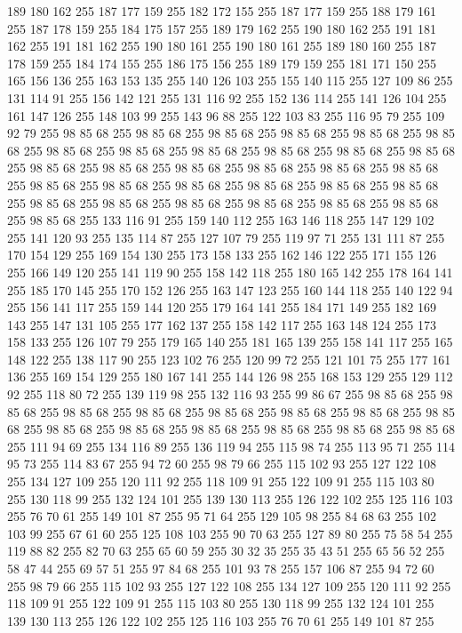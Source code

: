 189 180 162 255 187 177 159 255 182 172 155 255 187 177 159 255 188 179 161 255 187 178 159 255 184 175 157 255 189 179 162 255 190 180 162 255 191 181 162 255 191 181 162 255 190 180 161 255 190 180 161 255 189 180 160 255 187 178 159 255 184 174 155 255 186 175 156 255 189 179 159 255 181 171 150 255 165 156 136 255 163 153 135 255 140 126 103 255 155 140 115 255 127 109 86 255 131 114 91 255 156 142 121 255 131 116 92 255 152 136 114 255 141 126 104 255 161 147 126 255 148 103 99 255 143 96 88 255 122 103 83 255 116 95 79 255 109 92 79 255 98 85 68 255 98 85 68 255 98 85 68 255 98 85 68 255 98 85 68 255 98 85 68 255 98 85 68 255 98 85 68 255 98 85 68 255 98 85 68 255 98 85 68 255 98 85 68 255 98 85 68 255 98 85 68 255 98 85 68 255 98 85 68 255 98 85 68 255 98 85 68 255 98 85 68 255 98 85 68 255 98 85 68 255 98 85 68 255 98 85 68 255 98 85 68 255 98 85 68 255 98 85 68 255 98 85 68 255 98 85 68 255 98 85 68 255
98 85 68 255 98 85 68 255 133 116 91 255 159 140 112 255 163 146 118 255 147 129 102 255 141 120 93 255 135 114 87 255 127 107 79 255 119 97 71 255 131 111 87 255 170 154 129 255 169 154 130 255 173 158 133 255 162 146 122 255 171 155 126 255 166 149 120 255 141 119 90 255 158 142 118 255 180 165 142 255 178 164 141 255 185 170 145 255 170 152 126 255 163 147 123 255 160 144 118 255 140 122 94 255 156 141 117 255 159 144 120 255 179 164 141 255 184 171 149 255 182 169 143 255 147 131 105 255 177 162 137 255 158 142 117 255 163 148 124 255 173 158 133 255 126 107 79 255 179 165 140 255 181 165 139 255 158 141 117 255 165 148 122 255 138 117 90 255 123 102 76 255 120 99 72 255 121 101 75 255 177 161 136 255 169 154 129 255 180 167 141 255 144 126 98 255 168 153 129 255 129 112 92 255 118 80 72 255 139 119 98 255 132 116 93 255 99 86 67 255 98 85 68 255 98 85 68 255 98 85 68 255 98 85 68 255 98 85 68 255 98 85 68 255 98 85 68 255 98 85 68 255 98 85 68 255
98 85 68 255 98 85 68 255 98 85 68 255 98 85 68 255 98 85 68 255 111 94 69 255 134 116 89 255 136 119 94 255 115 98 74 255 113 95 71 255 114 95 73 255 114 83 67 255 94 72 60 255 98 79 66 255 115 102 93 255 127 122 108 255 134 127 109 255 120 111 92 255 118 109 91 255 122 109 91 255 115 103 80 255 130 118 99 255 132 124 101 255 139 130 113 255 126 122 102 255 125 116 103 255 76 70 61 255 149 101 87 255 95 71 64 255 129 105 98 255 84 68 63 255 102 103 99 255 67 61 60 255 125 108 103 255 90 70 63 255 127 89 80 255 75 58 54 255 119 88 82 255 82 70 63 255 65 60 59 255 30 32 35 255 35 43 51 255 65 56 52 255 58 47 44 255 69 57 51 255 97 84 68 255 101 93 78 255 157 106 87 255 94 72 60 255 98 79 66 255 115 102 93 255 127 122 108 255 134 127 109 255 120 111 92 255 118 109 91 255 122 109 91 255 115 103 80 255 130 118 99 255 132 124 101 255 139 130 113 255 126 122 102 255 125 116 103 255 76 70 61 255 149 101 87 255
